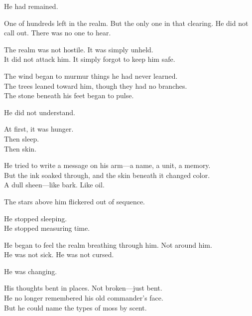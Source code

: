 \documentclass[12pt]{article}
\begin{document}
\vspace{0.5em}
He had remained.

\vspace{0.5em}
One of hundreds left in the realm. But the only one in that clearing. He did not call out. There was no one to hear.

\vspace{0.5em}
The realm was not hostile. It was simply unheld.\\
It did not attack him. It simply forgot to keep him safe.

\vspace{0.5em}
The wind began to murmur things he had never learned.\\
The trees leaned toward him, though they had no branches.\\
The stone beneath his feet began to pulse.

\vspace{0.5em}
He did not understand.

\vspace{0.5em}
At first, it was hunger.\\
Then sleep.\\
Then skin.

\vspace{0.5em}
He tried to write a message on his arm---a name, a unit, a memory.\\
But the ink soaked through, and the skin beneath it changed color.\\
A dull sheen---like bark. Like oil.

\vspace{0.5em}
The stars above him flickered out of sequence.

\vspace{0.5em}
He stopped sleeping.\\
He stopped measuring time.

\vspace{0.5em}
He began to feel the realm breathing through him. Not around him.\\
He was not sick. He was not cursed.

\vspace{0.5em}
He was changing.

\vspace{0.5em}
His thoughts bent in places. Not broken---just bent.\\
He no longer remembered his old commander’s face.\\
But he could name the types of moss by scent.
\end{document}

